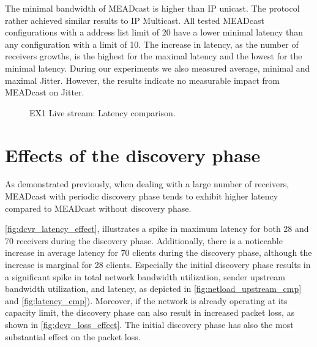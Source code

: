 The minimal bandwidth of MEADcast is higher than IP unicast.
The protocol rather achieved similar results to IP Multicast.
All tested MEADcast configurations with a address list limit of 20 have a lower
    minimal latency than any configuration with a limit of 10.
The increase in latency, as the number of receivers growths, is the highest for
    the maximal latency and the lowest for the minimal latency.
During our experiments we also measured average, minimal and maximal Jitter.
However, the results indicate no measurable impact from MEADcast on Jitter.

\begin{figure}
    \begin{center}
        
    \end{center}
    \caption[EX1 Live stream: Latency comparison]{
        EX1 Live stream: Latency comparison.
    }
    \label{fig:latency_cmp}
\end{figure}



\section{Effects of the discovery phase} %
\label{sec:Effects of the Discovery phase}

As demonstrated previously, when dealing with a large number of receivers,
    MEADcast with periodic discovery phase tends to exhibit higher latency
    compared to MEADcast without discovery phase.

\autoref{fig:dcvr_latency_effect}, illustrates a spike in maximum latency for
    both 28 and 70 receivers during the discovery phase.
Additionally, there is a noticeable increase in average latency for 70 clients
    during the discovery phase, although the increase is marginal for 28
    clients.
Especially the initial discovery phase results in a significant spike in
    total network bandwidth utilization, sender upstream bandwidth utilization,
    and latency, as depicted in \autoref{fig:netload_upstream_cmp} and
    \autoref{fig:latency_cmp}).
Moreover, if the network is already operating at its capacity limit, the
    discovery phase can also result in increased packet loss, as shown in 
    \autoref{fig:dcvr_loss_effect}.
The initial discovery phase has also the most substantial effect on the packet
    loss.

